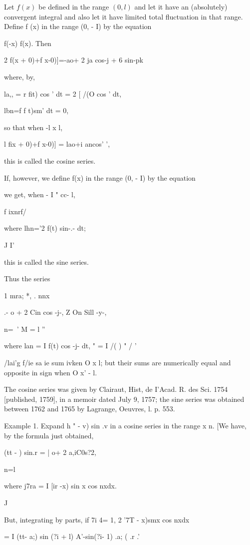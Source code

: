 Let $f(x)$ be defined in the range $(0,l)$ and let it have an
(absolutely) convergent integral and also let it have limited total
fluctuation in that range. Define f (x) in the range (0, - I) by the
equation

f(-x) f(x). Then

2 f(x + 0)+f x-0)]=-ao+ 2 ja cos-j + 6 sin-pk

where, by,

la,, = r fit) cos ' dt = 2 [ /(O cos ' dt,

lbn=f f t)sm' dt = 0,

so that when -l x l,

l fix + 0)+f x-0)] = lao+i ancos' ',

this is called the cosine series.

If, however, we define f(x) in the range (0, - I) by the equation

%
%

we get, when - I " cc- l,

f ixnrf/

where lhn='2 f(t) sin-.- dt;

J I'

this is called the sine series.

Thus the series

1 mra; *, . nnx

.- o + 2 Cin cos -j-, Z On Sill -y-,

  n=\ ' M = l ''

where lan = I f(t) cos -j- dt, " = I /( ) " / '

/lai'g f/ie sa ie sum ivken O x l; but their sums are numerically
equal and opposite in sign when O x' - l.

The cosine series was given by Clairaut, Hist, de I'Acad. R. des Sci.
1754 [published, 1759], in a memoir dated July 9, 1757; the sine
series was obtained between 1762 and 1765 by Lagrange, Oeuvres, l. p.
553.

Example 1. Expand h " - v) sin .v in a cosine series in the range x n.
[We have, by the formula just obtained,

  (tt - ) sin.r = | o+ 2 a,iC0s?2,

n=l

where j7ra = I [ir -x) sin x cos nxdx.

J

But, integrating by parts, if 7i 4= 1, 2 '7T - x)smx cos nxdx

= I (tt- a;) sin (?i + l) A'-sin(?i- 1) .a; ( .r .'

